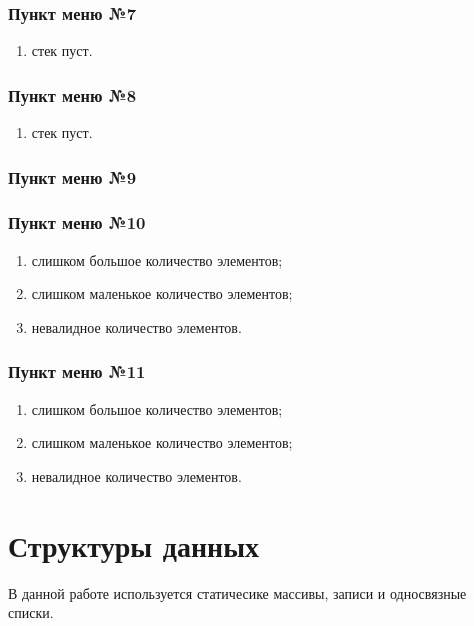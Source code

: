 \documentclass[a4paper,12pt]{extarticle}
\begin{document}
\subsubsection{Пункт меню №7}
\begin{enumerate}
    \item стек пуст.
\end{enumerate}

\subsubsection{Пункт меню №8}
\begin{enumerate}
    \item стек пуст.
\end{enumerate}

\subsubsection{Пункт меню №9}

\subsubsection{Пункт меню №10}
\begin{enumerate}
    \item слишком большое количество элементов;
    \item слишком маленькое количество элементов;
    \item невалидное количество элементов.
\end{enumerate}

\subsubsection{Пункт меню №11}
\begin{enumerate}
    \item слишком большое количество элементов;
    \item слишком маленькое количество элементов;
    \item невалидное количество элементов.
\end{enumerate}

\newpage

\section{Структуры данных}
В данной работе используется статичесике массивы, записи и односвязные списки.
\end{document}
